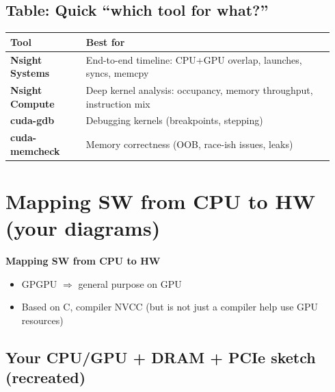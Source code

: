 \documentclass[11pt]{article}
\newcommand{\blue}[1]{\textcolor{myblue}{#1}}
\begin{document}
\subsection*{\blue{Table: Quick “which tool for what?”}}
\begin{center}
\renewcommand{\arraystretch}{1.15}
\begin{tabular}{|>{\bfseries}p{0.22\linewidth}|p{0.72\linewidth}|}
\hline
Tool & Best for \\
\hline
Nsight Systems & End-to-end timeline: CPU+GPU overlap, launches, syncs, memcpy \\
\hline
Nsight Compute & Deep kernel analysis: occupancy, memory throughput, instruction mix \\
\hline
cuda-gdb & Debugging kernels (breakpoints, stepping) \\
\hline
cuda-memcheck & Memory correctness (OOB, race-ish issues, leaks) \\
\hline
\end{tabular}
\end{center}

\section{\blue{Mapping SW from CPU to HW (your diagrams)}}

\textbf{Mapping SW from CPU to HW}
\begin{itemize}
\item GPGPU $\Rightarrow$ general purpose on GPU
\item Based on C, compiler NVCC (but is not just a compiler help use GPU resources)
\end{itemize}

\subsection*{\blue{Your CPU/GPU + DRAM + PCIe sketch (recreated)}}
\begin{center}
\end{center}
\end{document}
